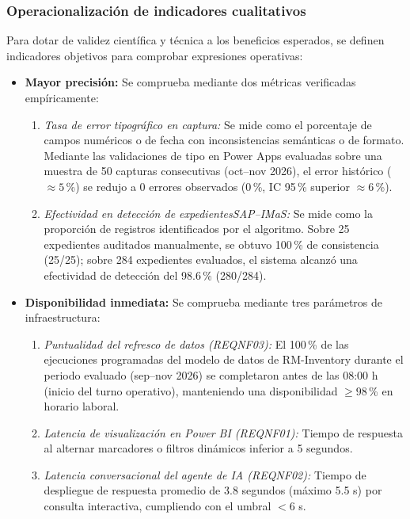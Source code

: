\subsubsection{Operacionalización de indicadores cualitativos}

Para dotar de validez científica y técnica a los beneficios esperados, se definen indicadores objetivos para comprobar expresiones operativas:
\begin{itemize}
    \item \textbf{Mayor precisión:} Se comprueba mediante dos métricas verificadas empíricamente:
    \begin{enumerate}
        \item \emph{Tasa de error tipográfico en captura:} Se mide como el porcentaje de campos numéricos o de fecha con inconsistencias semánticas o de formato. Mediante las validaciones de tipo en Power Apps evaluadas sobre una muestra de 50 capturas consecutivas (oct--nov 2026), el error histórico ($\approx 5$\,\%) se redujo a 0 errores observados (0\,\%, IC 95\,\% superior $\approx 6$\,\%).
        \item \emph{Efectividad en detección de expedientesSAP--IMaS:} Se mide como la proporción de registros identificados por el algoritmo. Sobre 25 expedientes auditados manualmente, se obtuvo 100\,\% de consistencia (25/25); sobre 284 expedientes evaluados, el sistema alcanzó una efectividad de detección del 98.6\,\% (280/284).
    \end{enumerate}
    \item \textbf{Disponibilidad inmediata:} Se comprueba mediante tres parámetros de infraestructura:
    \begin{enumerate}
        \item \emph{Puntualidad del refresco de datos (REQNF03):} El 100\,\% de las ejecuciones programadas del modelo de datos de RM-Inventory durante el periodo evaluado (sep--nov 2026) se completaron antes de las 08:00 h (inicio del turno operativo), manteniendo una disponibilidad $\ge 98$\,\% en horario laboral.
        \item \emph{Latencia de visualización en Power BI (REQNF01):} Tiempo de respuesta al alternar marcadores o filtros dinámicos inferior a 5 segundos.
        \item \emph{Latencia conversacional del agente de IA (REQNF02):} Tiempo de despliegue de respuesta promedio de 3.8 segundos (máximo 5.5 s) por consulta interactiva, cumpliendo con el umbral $< 6$ s.
    \end{enumerate}
\end{itemize}

